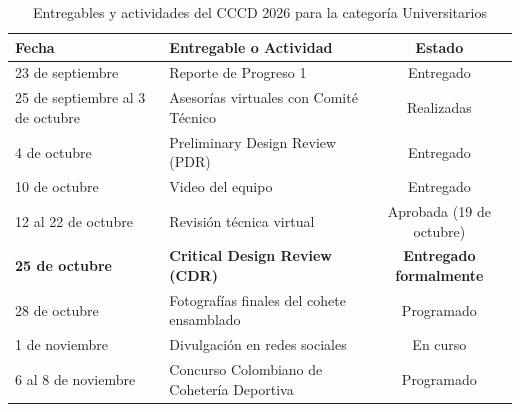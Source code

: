 \begin{table}[h!]
\centering
\caption{Entregables y actividades del CCCD 2026 para la categoría Universitarios}
\label{tab:cronograma_entregables}
\begin{tabular}{|l|p{7.5cm}|c|}
\hline
\rowcolor[HTML]{1B365D} 
\textbf{\color[HTML]{FFFFFF} Fecha} & \textbf{\color[HTML]{FFFFFF} Entregable o Actividad} & \textbf{\color[HTML]{FFFFFF} Estado} \\ \hline
23 de septiembre & Reporte de Progreso 1 & Entregado \\ \hline
25 de septiembre al 3 de octubre & Asesorías virtuales con Comité Técnico & Realizadas \\ \hline
4 de octubre & Preliminary Design Review (PDR) & Entregado \\ \hline
10 de octubre & Video del equipo & Entregado \\ \hline
12 al 22 de octubre & Revisión técnica virtual & Aprobada (19 de octubre) \\ \hline
\rowcolor[HTML]{DCFCE7}
\textbf{25 de octubre} & \textbf{Critical Design Review (CDR)} & \textbf{\color[HTML]{166534} Entregado formalmente} \\ \hline
28 de octubre & Fotografías finales del cohete ensamblado & Programado \\ \hline
1 de noviembre & Divulgación en redes sociales & En curso \\ \hline
6 al 8 de noviembre & Concurso Colombiano de Cohetería Deportiva & Programado \\ \hline
\end{tabular}
\end{table}
